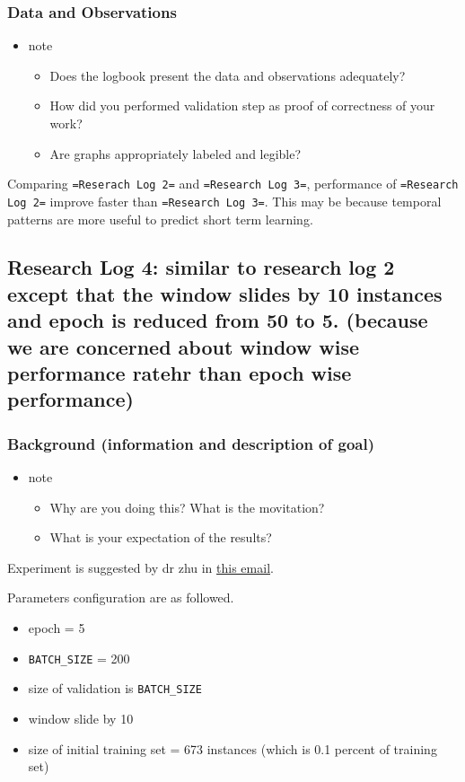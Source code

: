 \documentclass[11pt]{article}
\begin{document}
\subsubsection{Data and Observations}
\label{sec:orgc748092}
\begin{itemize}
\item note
\begin{itemize}
\item Does the logbook present the data and observations adequately?
\item How did you performed validation step as proof of correctness of your work?
\item Are graphs appropriately labeled and legible?
\end{itemize}
\end{itemize}

Comparing \texttt{=Reserach Log 2=} and \texttt{=Research Log 3=}, performance of \texttt{=Research Log 2=} improve faster than \texttt{=Research Log 3=}. This may be because temporal patterns are more useful to predict short term learning.
\subsection{Research Log 4: similar to research log 2 except that the window slides by 10 instances and epoch is reduced from 50 to 5. (because we are concerned about window wise performance ratehr than epoch wise performance)}
\label{sec:orgcb0b1c0}
\subsubsection{Background (information and description of goal)}
\label{sec:org4e837ab}
\begin{itemize}
\item note
\begin{itemize}
\item Why are you doing this? What is the movitation?
\item What is your expectation of the results?
\end{itemize}
\end{itemize}

Experiment is suggested by dr zhu in \href{https://mail.google.com/mail/u/0/\#inbox/FFNDWMGfzXvrGrBQHKdkLqlnMMfJDTdM}{this email}.

Parameters configuration are as followed.

\begin{itemize}
\item epoch = 5
\item \texttt{BATCH\_SIZE} = 200
\item size of validation is \texttt{BATCH\_SIZE}
\item window slide by 10
\item size of initial training set = 673 instances (which is 0.1 percent of training set)
\end{itemize}
\end{document}
